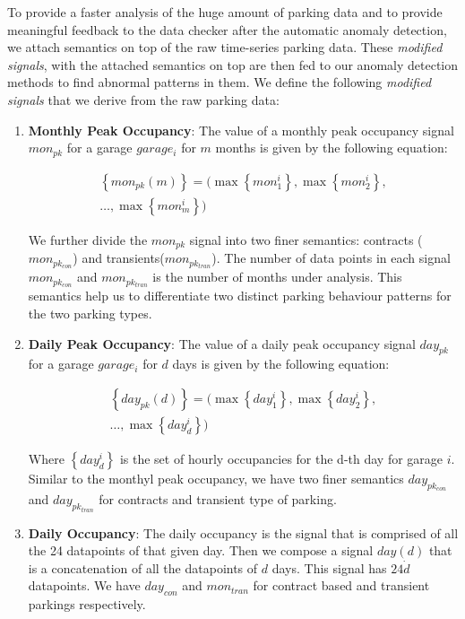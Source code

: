 \documentclass[10pt]{sigplanconf}
\begin{document}
To provide a faster analysis of the huge amount of parking data and to provide meaningful feedback to the data checker after the automatic anomaly detection, we attach semantics on top of the raw time-series parking data.  These \textit{modified signals}, with the attached semantics on top are then fed to our anomaly detection methods to find abnormal patterns in them.  We define the following \textit{modified signals} that we derive from the raw parking data:

\begin{enumerate}
\item \textbf{Monthly Peak Occupancy}:  The value of a monthly peak occupancy signal $mon_{pk}$ for a garage $garage_i$ for $m$ months is given by the following equation:

\begin{multline}
\left \{ mon_{pk} \left ( m \right )\right \} =   ( \max\left \{ mon_{1}^{i} \right \}, \max\left \{ mon_{2}^{i} \right \}, \\ 
 \ldots , \max\left \{ mon_{m}^{i} \right \}   ) 
\end{multline}

We further divide the $mon_{pk}$ signal into two finer semantics: contracts ($mon_{pk_{con}}$) and transients($mon_{pk_{tran}}$).  The number of data points in each signal $mon_{pk_{con}}$ and $mon_{pk_{tran}}$ is the number of months under analysis.  This semantics help us to differentiate two distinct parking behaviour patterns for the two parking types.  

\item \textbf{Daily Peak Occupancy}:  The value of a daily peak occupancy signal $day_{pk}$ for a garage $garage_i$ for $d$ days is given by the following equation:

\begin{multline}
\left \{ day_{pk} \left ( d \right )\right \} =   ( \max\left \{ day_{1}^{i} \right \}, \max\left \{ day_{2}^{i} \right \}, \\
\ldots , \max\left \{ day_{d}^{i} \right \}   ) 
\end{multline}

Where $\left \{day_{d}^{i} \right \}$ is the set of hourly occupancies for the d-th day for garage $i$.  Similar to the monthyl peak occupancy, we have two finer semantics $day_{pk_{con}}$ and $day_{pk_{tran}}$ for contracts and transient type of parking.

\item \textbf{Daily Occupancy}:  The daily occupancy is the signal that is comprised of all the 24 datapoints of that given day.  Then we compose a signal $day \left ( d \right )$ that is a concatenation of all the datapoints of $d$ days.  This signal has $24 \dot d$ datapoints.  We have $day_{con}$ and $mon_{tran}$ for contract based and transient parkings respectively.

\end{enumerate}
\end{document}
